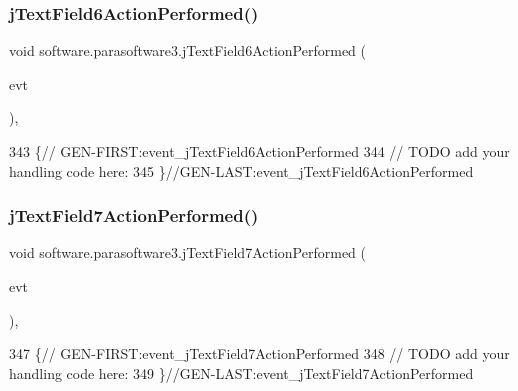 \subsubsection{\texorpdfstring{j\+Text\+Field6\+Action\+Performed()}{jTextField6ActionPerformed()}}
{\footnotesize\ttfamily void software.\+parasoftware3.\+j\+Text\+Field6\+Action\+Performed (\begin{DoxyParamCaption}\item[{java.\+awt.\+event.\+Action\+Event}]{evt }\end{DoxyParamCaption})\hspace{0.3cm}{\ttfamily [inline]}, {\ttfamily [private]}}


\begin{DoxyCode}
343                                                                             \{\textcolor{comment}{//
      GEN-FIRST:event\_jTextField6ActionPerformed}
344         \textcolor{comment}{// TODO add your handling code here:}
345     \}\textcolor{comment}{//GEN-LAST:event\_jTextField6ActionPerformed}
\end{DoxyCode}
\mbox{\label{classsoftware_1_1parasoftware3_ada917140604cb8cf60b114f8777da195}} 
\subsubsection{\texorpdfstring{j\+Text\+Field7\+Action\+Performed()}{jTextField7ActionPerformed()}}
{\footnotesize\ttfamily void software.\+parasoftware3.\+j\+Text\+Field7\+Action\+Performed (\begin{DoxyParamCaption}\item[{java.\+awt.\+event.\+Action\+Event}]{evt }\end{DoxyParamCaption})\hspace{0.3cm}{\ttfamily [inline]}, {\ttfamily [private]}}


\begin{DoxyCode}
347                                                                             \{\textcolor{comment}{//
      GEN-FIRST:event\_jTextField7ActionPerformed}
348         \textcolor{comment}{// TODO add your handling code here:}
349     \}\textcolor{comment}{//GEN-LAST:event\_jTextField7ActionPerformed}
\end{DoxyCode}
\mbox{\label{classsoftware_1_1parasoftware3_aef5f7c5d92a7d6c58dfc8ce2fd80da01}} 
